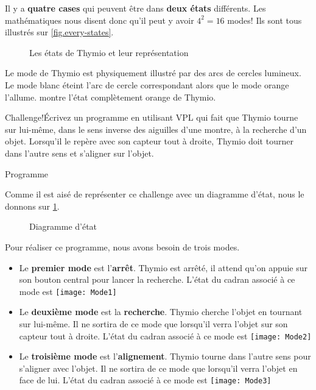 Il y a \textbf{quatre cases} qui peuvent être dans \textbf{deux états} différents. Les mathématiques nous disent donc qu'il peut y avoir $4^2 = 16$ modes! Ils sont tous illustrés sur \cref{fig.every-states}.

\begin{figure}[h]
    \centering
    \hspace{1cm}
    \caption{Les états de Thymio et leur représentation}
\end{figure}

Le mode de Thymio est physiquement illustré par des arcs de cercles lumineux. Le mode blanc éteint l'arc de cercle correspondant alors que le mode orange l'allume.  montre l'état complètement orange de Thymio.


\begin{bclogo}[couleur = pink!30, arrondi = 0.1, logo = \bccrayon, ombre = true]{Challenge!}Écrivez un programme en utilisant VPL qui fait que Thymio tourne sur lui-même, dans le sens inverse des aiguilles d'une montre, à la recherche d'un objet. Lorsqu'il le repère avec son capteur tout à droite, Thymio doit tourner dans l'autre sens et s'aligner sur l'objet.
\end{bclogo}

{\raggedleft \hfill Programme }

Comme il est aisé de représenter ce challenge avec un diagramme d'état, nous le donnons sur \cref{fig.State_diagram_mouse}.

\begin{figure}[h]
\begin{center}
\caption{Diagramme d'état}\label{fig.State_diagram_mouse}
\end{center}
\end{figure}

Pour réaliser ce programme, nous avons besoin de trois modes. 

\begin{itemize}
	\item Le \textbf{premier mode} est l'\textbf{arrêt}. Thymio est arrêté, il attend qu'on appuie sur son bouton central pour lancer la recherche. L'état du cadran associé à ce mode est \texttt{[image: Mode1]}
	\item Le \textbf{deuxième mode} est la \textbf{recherche}. Thymio cherche l'objet en tournant sur lui-même. Il ne sortira de ce mode que lorsqu'il verra l'objet sur son capteur tout à droite. L'état du cadran associé à ce mode est \texttt{[image: Mode2]}
	\item Le \textbf{troisième mode} est l'\textbf{alignement}. Thymio tourne dans l'autre sens pour s'aligner avec l'objet. Il ne sortira de ce mode que lorsqu'il verra l'objet en face de lui. L'état du cadran associé à ce mode est \texttt{[image: Mode3]}
\end{itemize}

